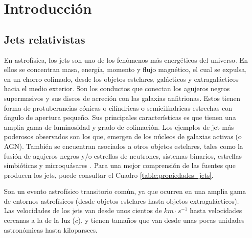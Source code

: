 \documentclass[12pt,a4paper]{book}
\begin{document}
%
%
\chapter{Introducción}

\section{Jets relativistas}
En astrofísica, los jets son uno de los fenómenos más energéticos del universo. En ellos se concentran masa, energía, momento y flujo magnético, el cual se expulsa, en un chorro colimado, desde los objetos
estelares, galácticos y extragalácticos hacia el medio exterior. Son los conductos que conectan los agujeros negros supermasivos y sus discos de acreción con las galaxias anfitrionas.
Estos tienen forma de protuberancias cónicas o cilíndricas 
o semicilíndricas estrechas con ángulo de apertura pequeño. Sus principales características es que tienen una 
amplia gama de luminosidad y grado de colimación. 
Los ejemplos de jet más poderosos observados son los que, emergen de los núcleos de galaxias activas (o AGN). También se encuentran asociados a otros objetos estelares, tales como la fusión de agujeros negros y/o
estrellas de neutrones, sistemas binarios, estrellas simbióticas y microquásares \citep{deGouveiaDalPino:2004jy}. %
Para una mejor comprensión de las fuentes que producen los jets, puede consultar el Cuadro \ref{table:propiedades_jets}.



Son un evento astrofísico transitorio común, ya que ocurren en una amplia gama de entornos astrofísicos (desde objetos estelares hasta objetos extragalácticos). Las velocidades de los jets van desde unos cientos de 
$km \cdot s^{-1}$ hasta velocidades cercanas a la de la luz ($c$), y tienen tamaños que van desde unas pocas unidades astronómicas hasta kiloparsecs.
\end{document}
